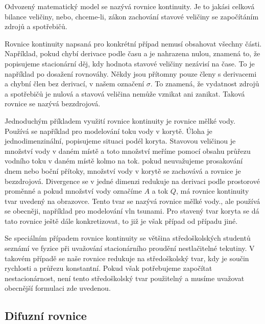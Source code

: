 \documentclass[12pt]{article}
\begin{document}
Odvozený matematický model se nazývá rovnice kontinuity. Je to jakási celková bilance veličiny, nebo, chceme-li, zákon zachování stavové veličiny se započítáním zdrojů a spotřebičů.

Rovnice kontinuity napsaná pro konkrétní případ nemusí obsahovat všechny části. Například, pokud chybí derivace podle času a je nahrazena nulou, znamená to, že popisujeme stacionární děj, kdy hodnota stavové veličiny nezávisí na čase. To je například po dosažení rovnováhy. Někdy jsou přítomny pouze členy s derivacemi a chybní člen bez derivací, v našem označení $\sigma$. To znamená, že vydatnost zdrojů a spotřebičů je nulová a stavová  veličina nemůže vznikat ani zanikat. Taková rovnice se nazývá bezzdrojová.

Jednoduchým příkladem využití rovnice kontinuity je rovnice mělké vody. Používá se například pro modelování toku vody v korytě. Úloha je jednodimenzinální, popisujeme situaci podél koryta. Stavovou veličinou je množství vody v daném místě a toto množství meříme pomocí obsahu průřezu vodního toku v daném místě kolmo na tok. pokud neuvažujeme prosakování dnem nebo boční přítoky, množství vody v korytě se zachovává a rovnice je bezzdrojová. Divergence se v jedné dimenzi redukuje na derivaci podle prostorové proměnné a pokud množství vody označíme $A$ a tok $Q$, má rovnice kontinuity tvar uvedený na obrazovce. Tento tvar se nazývá rovnice mělké vody., ale používá se obecněji, například pro modelování vln tsunami. Pro stavený tvar koryta se dá tato rovnice ještě dále konkretizovat, to již je však případ od případu jiné.

Se speciálním případem rovnice kontinuity se většina středoškolských studentů seznámí ve fyzice při uvažování stacionárního proudění nestlačitelné tekutiny. V takovém případě se naše rovnice redukuje na středoškolský tvar, kdy je součin rychlosti a průřezu konstantní. Pokud však potřebujeme započítat nestacionárnost, není tento středoškolský tvar použitelný a musíme uvažovat obecnější formulaci zde uvedenou.

\subsection{Difuzní rovnice}
\end{document}
